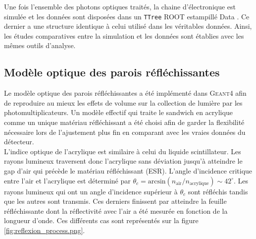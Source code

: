 Une fois l'ensemble des photons optiques traités, la chaine d'électronique est simulée et les données sont disposées dans un \texttt{TTree} ROOT estampillé \og Data \fg{}. Ce dernier a une structure identique à celui utilisé dans les véritables données. Ainsi, les études comparatives entre la simulation et les données sont établies avec les mêmes outils d'analyse.\\

\bigbreak

\subsection{Modèle optique des parois réfléchissantes}

Le modèle optique des parois réfléchissantes a été implémenté dans \textsc{Geant4} afin de reproduire au mieux les effets de volume sur la collection de lumière par les photomultiplicateurs. Un modèle effectif qui traite le sandwich en acrylique comme un unique matériau réfléchissant a été choisi afin de garder la flexibilité nécessaire lors de l'ajustement plus fin en comparant avec les vraies données du détecteur.\\

L'indice optique de l'acrylique est similaire à celui du liquide scintillateur. Les rayons lumineux traversent donc l'acrylique sans déviation jusqu'à atteindre le gap d'air qui précède le matériau réfléchissant (ESR). L'angle d'incidence critique entre l'air et l'acrylique est déterminé par $\theta_c = \textrm{arcsin}(n_{\textrm{air}}/n_{\textrm{acrylique}}) \sim 42^{\circ}$. Les rayons lumineux qui ont un angle d'incidence supérieur à $\theta_c$ sont réfléchis tandis que les autres sont transmis. Ces derniers finissent par atteindre la feuille réfléchissante dont la réflectivité avec l'air a été mesurée en fonction de la longueur d'onde. Ces différents cas sont représentés sur la figure \ref{fig:reflexion_process.png}.\\


